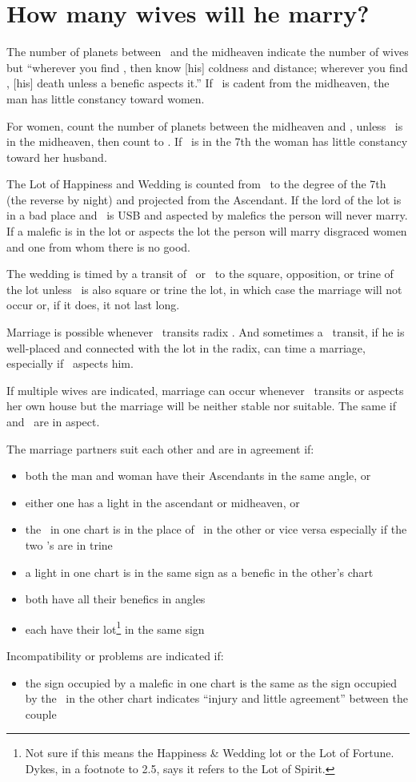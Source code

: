 \section{How many wives will he marry?}

The number of planets between \Venus\, and the midheaven indicate the number of wives but ``wherever you find \Saturn, then know [his] coldness and distance; wherever you find \Mars, [his] death unless a benefic aspects it.'' If \Venus\, is cadent from the midheaven, the man has little constancy toward women.

For women, count the number of planets between the midheaven and \Mars, unless \Mars\, is in the midheaven, then count to \Jupiter.  If \Mars\, is in the 7th the woman has little constancy toward her husband.

The Lot of Happiness and Wedding is counted from \Venus\, to the degree of the 7th (the reverse by night) and projected from the Ascendant.  If the lord of the lot is in a bad place and \Venus\, is USB and aspected by malefics the person will never marry. If a malefic is in the lot or aspects the lot the person will marry disgraced women and one from whom there is no good.

The wedding is timed by a transit of \Jupiter\, or \Venus\, to the square, opposition, or trine of the lot unless \Saturn\, is also square or trine the lot, in which case the marriage will not occur or, if it does, it not last long.

Marriage is possible whenever \Jupiter\, transits radix \Venus. And sometimes a \Saturn\, transit, if he is well-placed and connected with the lot in the radix, can time a marriage, especially if \Jupiter\, aspects him.

If multiple wives are indicated, marriage can occur whenever \Venus\, transits or aspects her own house but the marriage will be neither stable nor suitable. The same if \Venus\, and \Mars\, are in aspect.

The marriage partners suit each other and are in agreement if:
\begin{itemize}[topsep=0em,itemsep=0em]
\item both the man and woman have their Ascendants in the same angle, or 
\item either one has a light in the ascendant or midheaven, or 
\item the \Moon\, in one chart is in the place of \Venus\, in the other or vice versa especially if the two \Moon's are in trine
\item a light in one chart is in the same sign as a benefic in the other's chart
\item both have all their benefics in angles
\item each have their lot\footnote{Not sure if this means the Happiness \& Wedding lot or the Lot of Fortune. Dykes, in a footnote to 2.5, says it refers to the Lot of Spirit.} in the same sign
\end{itemize}

Incompatibility or problems are indicated if:
\begin{itemize}[topsep=0em,itemsep=0em]
\item the sign occupied by a malefic in one chart is the same as the sign occupied by the \Moon\, in the other chart indicates ``injury and little agreement'' between the couple
\end{itemize}